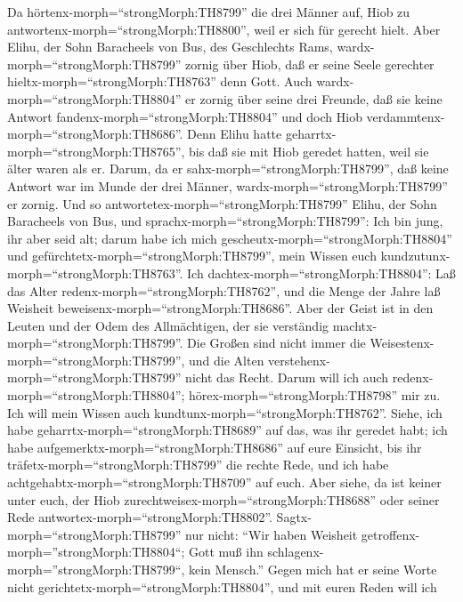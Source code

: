  Da hörtenx-morph=``strongMorph:TH8799'' die drei Männer
auf, Hiob zu antwortenx-morph=``strongMorph:TH8800'', weil er sich für
gerecht hielt.  Aber Elihu, der Sohn Baracheels von Bus, des
Geschlechts Rams, wardx-morph=``strongMorph:TH8799'' zornig über Hiob,
daß er seine Seele gerechter hieltx-morph=``strongMorph:TH8763'' denn
Gott.  Auch wardx-morph=``strongMorph:TH8804'' er zornig
über seine drei Freunde, daß sie keine Antwort
fandenx-morph=``strongMorph:TH8804'' und doch Hiob
verdammtenx-morph=``strongMorph:TH8686''.  Denn Elihu hatte
geharrtx-morph=``strongMorph:TH8765'', bis daß sie mit Hiob geredet
hatten, weil sie älter waren als er.  Darum, da er
sahx-morph=``strongMorph:TH8799'', daß keine Antwort war im Munde der
drei Männer, wardx-morph=``strongMorph:TH8799'' er zornig. 
Und so antwortetex-morph=``strongMorph:TH8799'' Elihu, der Sohn
Baracheels von Bus, und sprachx-morph=``strongMorph:TH8799'': Ich bin
jung, ihr aber seid alt; darum habe ich mich
gescheutx-morph=``strongMorph:TH8804'' und
gefürchtetx-morph=``strongMorph:TH8799'', mein Wissen euch
kundzutunx-morph=``strongMorph:TH8763''.  Ich
dachtex-morph=``strongMorph:TH8804'': Laß das Alter
redenx-morph=``strongMorph:TH8762'', und die Menge der Jahre laß
Weisheit beweisenx-morph=``strongMorph:TH8686''.  Aber der
Geist ist in den Leuten und der Odem des Allmächtigen, der sie
verständig machtx-morph=``strongMorph:TH8799''.  Die Großen
sind nicht immer die Weisestenx-morph=``strongMorph:TH8799'', und die
Alten verstehenx-morph=``strongMorph:TH8799'' nicht das Recht.
 Darum will ich auch redenx-morph=``strongMorph:TH8804'';
hörex-morph=``strongMorph:TH8798'' mir zu. Ich will mein Wissen auch
kundtunx-morph=``strongMorph:TH8762''.  Siehe, ich habe
geharrtx-morph=``strongMorph:TH8689'' auf das, was ihr geredet habt; ich
habe aufgemerktx-morph=``strongMorph:TH8686'' auf eure Einsicht, bis ihr
träfetx-morph=``strongMorph:TH8799'' die rechte Rede,  und
ich habe achtgehabtx-morph=``strongMorph:TH8709'' auf euch. Aber siehe,
da ist keiner unter euch, der Hiob
zurechtweisex-morph=``strongMorph:TH8688'' oder seiner Rede
antwortex-morph=``strongMorph:TH8802''. 
Sagtx-morph=``strongMorph:TH8799'' nur nicht: ``Wir haben Weisheit
getroffenx-morph=''strongMorph:TH8804``; Gott muß ihn
schlagenx-morph=''strongMorph:TH8799``, kein Mensch.'' 
Gegen mich hat er seine Worte nicht
gerichtetx-morph=``strongMorph:TH8804'', und mit euren Reden will ich
